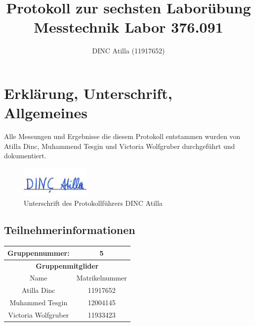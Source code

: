 \documentclass[a4paper]{article}
\title{Protokoll zur sechsten Laborübung\\Messtechnik Labor 376.091}
\author{DINC Atilla (11917652)}
\begin{document}
\newcommand{\unit}[1]{\ensuremath{\, \mathrm{#1}}} %
\pagestyle{fancy}
\fancyfoot[C]{\textbf{\thepage /\pageref{LastPage}}}
\renewcommand{\footrulewidth}{0.4pt}

\normalsize
\maketitle
\tableofcontents
\pagebreak
\section{Erklärung, Unterschrift, Allgemeines}
Alle Messungen und Ergebnisse die diesem Protokoll entstammen wurden von Atilla Dinc,
Muhammend Tesgin und Victoria Wolfgruber durchgeführt und dokumentiert.

\begin{figure}[h]
    \centering
    \includegraphics[width=0.3\textwidth]{images/Unterschrift}
    \caption{Unterschrift des Protokollführers DINC Atilla}
\end{figure}

\subsection{Teilnehmerinformationen}
	\begin{tabular}{|c| c|}
		\hline
        \textbf{Gruppennummer:} & 5                                                                                        \\
        \hline
		\multicolumn{2}{|c|}{\textbf{Gruppenmitglider}}                                                                                        \\
		\hline
        Name & Matrikelnummer\\
        \hline
        Atilla Dinc & 11917652\\
        Muhammed Tesgin & 12004145\\
        Victoria Wolfgruber & 11933423\\
        \hline
	\end{tabular}
\end{document}
